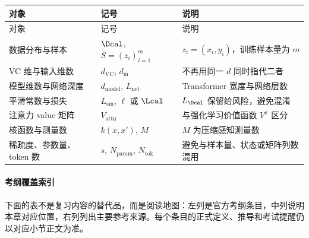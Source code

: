 \begin{longtable}{L{0.25\textwidth}L{0.20\textwidth}L{0.45\textwidth}}
\toprule
对象 & 记号 & 说明 \\
\midrule
\endfirsthead
\toprule
对象 & 记号 & 说明 \\
\midrule
\endhead
数据分布与样本 & \(\Dcal\), \(S=(z_i)_{i=1}^m\) & \(z_i=(x_i,y_i)\)，训练样本量为 \(m\) \\
VC 维与输入维数 & \(d_{\mathrm{VC}}\), \(d_{\mathrm{in}}\) & 不再用同一 \(d\) 同时指代二者 \\
模型维数与网络深度 & \(d_{\mathrm{model}}\), \(L_{\mathrm{net}}\) & Transformer 宽度与网络层数 \\
平滑常数与损失 & \(L_{\mathrm{sm}}\), \(\ell\) 或 \(\Lcal\) & \(L_{\Dcal}\) 保留给风险，避免混淆 \\
注意力 value 矩阵 & \(V_{\mathrm{attn}}\) & 与强化学习价值函数 \(V^\pi\) 区分 \\
核函数与测量数 & \(k(x,x')\), \(M\) & \(M\) 为压缩感知测量数 \\
稀疏度、参数量、token 数 & \(s\), \(N_{\mathrm{param}}\), \(N_{\mathrm{tok}}\) & 避免与样本量、状态或矩阵列数混用 \\
\bottomrule
\end{longtable}

\paragraph{考纲覆盖索引}

下面的表不是复习内容的替代品，而是阅读地图：左列是官方考纲条目，中列说明本章对应位置，右列列出主要参考来源。每个条目的正式定义、推导和考试提醒仍以对应小节正文为准。

